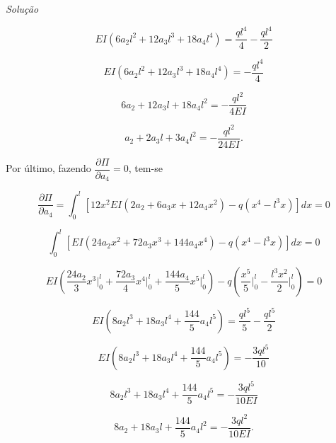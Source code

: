 \documentclass[
	12pt,				%
	openright,			%
    twoside,			%
	a4paper,			%
	english,			%
	french,				%
	spanish,			%
	brazil				%
	]{abntex2}
\makeatletter
\renewenvironment{proof}[1][\proofname]{
	\par\pushQED{\qed}%
	\normalfont \topsep6\p@\@plus6\p@\relax
	\trivlist
	\item\relax
		{\itshape
			#1\@addpunct{.}}\hspace\labelsep\ignorespaces
}{%
	\popQED\endtrivlist\@endpefalse
}
\newenvironment{solution}{
	\begin{proof}[Solução]
}{%
	\end{proof}
}
\numberwithin{lema}{chapter}
\numberwithin{teorema}{chapter}
\numberwithin{definicao}{chapter}
\numberwithin{exemplo}{chapter}
\numberwithin{figure}{chapter}
\makeatother
\begin{document}
\begin{solution}
	$$
		EI(6a_2 l^2 + 12a_3 l^3 + 18a_4 l^4)
		=
		\frac{ql^4}{4}
		-
		\frac{ql^4}{2}
	$$
	
	$$
		EI(6a_2 l^2 + 12a_3 l^3 + 18a_4 l^4)
		=
		-\frac{ql^4}{4}
	$$
	
	$$
		6a_2 + 12a_3 l + 18a_4 l^2
		=
		-\frac{ql^2}{4EI}
	$$
	
	\begin{equation}
		\label{eq:exemp_rayritz_approx3_eq2}
		a_2 + 2a_3 l + 3a_4 l^2 = - \frac{ql^2}{24EI}
		\text{.}
	\end{equation}
	
	Por último, fazendo $\dfrac{\partial \Pi}{\partial a_4}=0$, tem-se
	
	\begin{equation}
		\label{eqn:cap_metodo_ray_ritz:exemp_v3_diff_a4}
		\frac{\partial \Pi}{\partial a_4}
		=
		\int_0^l \left [
			12x^2EI(2a_2 + 6a_3x + 12a_4x^2)
			-
			q(x^4 - l^3x)
		\right ] dx
		= 0
	\end{equation}
	
	$$
		\int_0^l \left [
			EI(24a_2 x^2 + 72 a_3 x^3 + 144 a_4 x^4)
			-
			q(x^4 - l^3 x)
		\right ] dx
		= 0
	$$
	
	$$
		EI \left ( 
			\frac{24a_2}{3}x^3 \Big |_0^l
			+
			\frac{72a_3}{4}x^4 \Big |_0^l
			+
			\frac{144a_4}{5}x^5 \Big |_0^l
		\right )
		-
		q \left (
			\frac{x^5}{5} \Big |_0^l
			-
			\frac{l^3x^2}{2} \Big |_0^l
		\right )
		= 0
	$$
	
	$$
		EI \left (
			8a_2 l^3 + 18 a_3 l^4 + \frac{144}{5} a_4 l^5
		\right )
		=
		\frac{ql^5}{5}
		-
		\frac{ql^5}{2}
	$$
	
	$$
		EI \left (
			8a_2 l^3 + 18 a_3 l^4 + \frac{144}{5} a_4 l^5
		\right )
		=
		-\frac{3ql^5}{10}
	$$
	
	$$
		8a_2 l^3 + 18 a_3 l^4 + \frac{144}{5} a_4 l^5
		=
		-\frac{3ql^5}{10EI}
	$$
	
	\begin{equation}
		\label{eq:exemp_rayritz_approx3_eq3}
		8a_2 + 18a_3 l + \frac{144}{5} a_4 l^2 
		=
		-\frac{3ql^2}{10EI}
		\text{.}
	\end{equation}
	

\end{solution}
\end{document}
